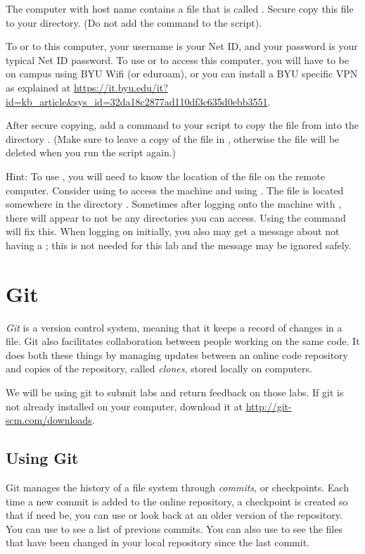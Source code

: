 \begin{problem}
The computer with host name  contains a file that is called .
Secure copy this file to your  directory.
(Do not add the  command to the script).

To  or  to this computer, your username is your Net ID, and your password is your typical Net ID password.
To use  or  to access this computer, you will have to be on campus using BYU Wifi (or eduroam), or you can install a BYU specific VPN as explained at \url{https://it.byu.edu/it?id=kb_article&sys_id=32da18c2877ad110df3c635d0ebb3551}.

After secure copying, add a command to your script to copy the file from  into the directory .
(Make sure to leave a copy of the file in , otherwise the file will be deleted when you run the script again.)

\noindent Hint: To use , you will need to know the location of the file on the remote computer.
Consider using  to access the machine and using .
The file is located somewhere in the directory .
Sometimes after logging onto the machine with , there will appear to not be any directories you can access.
Using the command  will fix this.
When logging on initially, you also may get a message about not having a ; this is not needed for this lab and the message may be ignored safely.
\label{problem:ssh}
\end{problem}


\section*{Git} %
\emph{Git} is a version control system, meaning that it keeps a record of changes in a file.
Git also facilitates collaboration between people working on the same code.
It does both these things by managing updates between an online code repository and copies of the repository, called \emph{clones}, stored locally on computers.

We will be using git to submit labs and return feedback on those labs. If git is not already installed on your computer, download it at \url{http://git-scm.com/downloads}.

\subsection*{Using Git} %
Git manages the history of a file system through \emph{commits}, or checkpoints.
Each time a new commit is added to the online repository, a checkpoint is created so that if need be, you can use or look back at an older version of the repository.
You can use  to see a list of previous commits.
You can also use  to see the files that have been changed in your local repository since the last commit.

